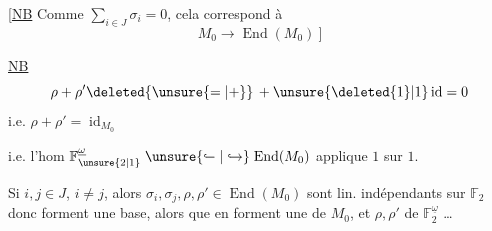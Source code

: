 [\uline{NB} Comme $\sum_{i\in J}\sigma_i=0$, cela correspond à 
\[
M_0\longrightarrow\operatorname{End}(M_0)\ ]
\]


\uline{NB}   
\[
\rho+\rho'\deleted{\unsure{=|+}}\,+\unsure{\deleted{1}|1}\operatorname{id}=0
\]
i.e. $\rho+\rho'=\operatorname{id}_{M_0}$

i.e. l'hom $\mathbb F_{\unsure{2|1}}^{\underline\omega}\mathrel{\unsure{\lhook\joinrel\relbar|\hookrightarrow}}\operatorname{End}(M_0)$ applique $1$ sur $1$.

Si $i,j\in J$, $i\ne j$, alors $\sigma_i,\sigma_j,\rho,\rho'\in\operatorname{End}(M_0)$ sont lin. indépendants sur $\mathbb F_2$ donc forment une base,  alors que  en forment une de $M_0$, et $\rho,\rho'$ de $\mathbb F_2^{\underline\omega}$ \ldots


